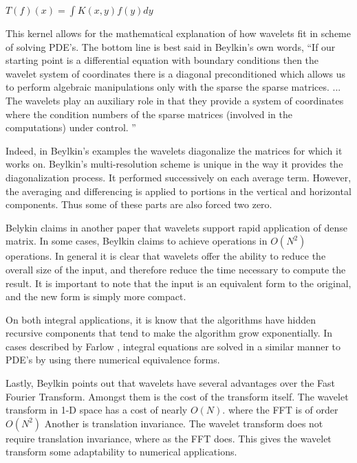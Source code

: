 $T(f)(x) = \int K(x,y) f(y)dy $

This kernel allows for the mathematical explanation of how wavelets fit in scheme of solving PDE's.  The bottom line is best said in Beylkin's own words, ``If our starting point is a differential equation with boundary conditions then the wavelet system of coordinates there is a diagonal preconditioned which allows us to perform algebraic manipulations only with the sparse the sparse matrices. ... The wavelets play an auxiliary role in that they provide a system of coordinates where the condition numbers of the sparse matrices (involved in the computations) under control.  ''

Indeed, in Beylkin's examples the wavelets diagonalize the matrices for which it works on.  Beylkin's multi-resolution scheme is unique in the way it provides the diagonalization process.  It performed successively on each average term.  However, the averaging and differencing is applied to portions in the vertical and horizontal components.  Thus some of these parts are also forced two zero. %


Belykin claims in another paper that wavelets support rapid application of dense matrix.  In some cases, Beylkin claims to achieve operations in $O(N^2)$ operations.  In general it is clear that wavelets offer the ability to reduce the overall size of the input, and therefore reduce the time necessary to compute the result.  It is important to note that the input is an equivalent form to the original, and the new form is simply more compact.  

On both integral applications, it is know that the algorithms have hidden recursive components that tend to make the algorithm grow exponentially.    In cases described by Farlow \cite{PDEfSE}, integral equations are solved in a similar manner to PDE's by using there numerical equivalence forms.  

Lastly, Beylkin points out that wavelets have several advantages over the Fast Fourier Transform.  Amongst them is the cost of the transform itself.  The wavelet transform in 1-D space has a cost of nearly $O (N)$. where the FFT is of order $O(N^2)$  Another is translation invariance.  The wavelet transform does not require translation invariance, where as the FFT does.  This gives the wavelet transform some adaptability to numerical applications.  




